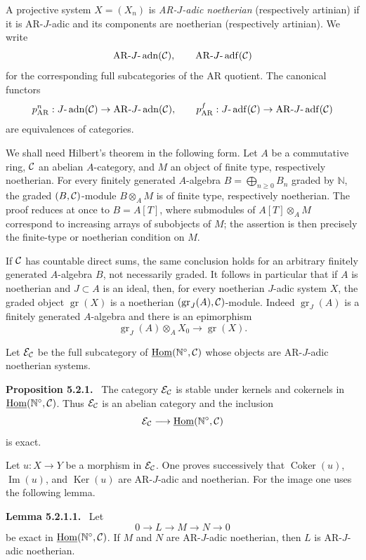 \documentclass[11pt]{article}
\theoremstyle{plain}
\theoremstyle{definition}
\theoremstyle{remark}
\newenvironment{statement}[1]{\par\medskip\noindent\textbf{#1.}\ }{\par\medskip}
\newcommand{\bN}{\mathbb N}
\DeclareMathOperator{\Hom}{Hom}
\DeclareMathOperator{\Ker}{Ker}
\DeclareMathOperator{\Coker}{Coker}
\DeclareMathOperator{\Imn}{Im}
\DeclareMathOperator{\gr}{gr}
\newcommand{\AR}{\mathrm{AR}}
\providecommand{\adn}{\operatorname{adn}}
\providecommand{\adf}{\operatorname{adf}}
\begin{document}
A projective system $X=(X_n)$ is \emph{AR-$J$-adic noetherian} (respectively
artinian) if it is AR-$J$-adic and its components are noetherian (respectively
artinian). We write
\[
     \AR\text{-}J\text{-}\adn(\cC),
     \qquad
     \AR\text{-}J\text{-}\adf(\cC)
\]
for the corresponding full subcategories of the AR quotient. The canonical functors
\[
      p_{\AR}^n:J\text{-}\adn(\cC)\to\AR\text{-}J\text{-}\adn(\cC),
      \qquad
      p_{\AR}^f:J\text{-}\adf(\cC)\to\AR\text{-}J\text{-}\adf(\cC)
\]
are equivalences of categories.

We shall need Hilbert's theorem in the following form. Let $A$ be a commutative
ring, $\mathcal C$ an abelian $A$-category, and $M$ an object of finite type,
respectively noetherian. For every finitely generated $A$-algebra
$B=\bigoplus_{n\ge0}B_n$ graded by $\bN$, the graded $(B,\mathcal C)$-module
$B\otimes_AM$ is of finite type, respectively noetherian. The proof reduces at once
to $B=A[T]$, where submodules of $A[T]\otimes_AM$ correspond to increasing arrays
of subobjects of $M$; the assertion is then precisely the finite-type or noetherian
condition on $M$.

If $\mathcal C$ has countable direct sums, the same conclusion holds for an arbitrary
finitely generated $A$-algebra $B$, not necessarily graded. It follows in particular
that if $A$ is noetherian and $J\subset A$ is an ideal, then, for every noetherian
$J$-adic system $X$, the graded object $\gr(X)$ is a noetherian
$(\gr_J(A),\cC)$-module. Indeed $\gr_J(A)$ is a finitely generated $A$-algebra and
there is an epimorphism
\[
     \gr_J(A)\otimes_A X_0\longrightarrow \gr(X).
\]

Let $\mathcal E_\mathcal C$ be the full subcategory of $\underline{\Hom}(\bN^\circ,\cC)$ whose
objects are AR-$J$-adic noetherian systems.

\begin{statement}{Proposition 5.2.1}
The category $\mathcal E_\mathcal C$ is stable under kernels and cokernels in
$\underline{\Hom}(\bN^\circ,\cC)$. Thus $\mathcal E_\mathcal C$ is an abelian category and the
inclusion
\[
       \cE_\cC\longrightarrow \underline{\Hom}(\bN^\circ,\cC)
\]
is exact.
\end{statement}

Let $u:X\to Y$ be a morphism in $\mathcal E_\mathcal C$. One proves successively that
$\Coker(u)$, $\Imn(u)$, and $\Ker(u)$ are AR-$J$-adic and noetherian. For the
image one uses the following lemma.

\begin{statement}{Lemma 5.2.1.1}
Let
\[
       0\to L\to M\to N\to0
\]
be exact in $\underline{\Hom}(\bN^\circ,\cC)$. If $M$ and $N$ are AR-$J$-adic
noetherian, then $L$ is AR-$J$-adic noetherian.
\end{statement}
\end{document}
